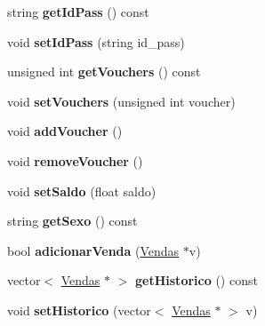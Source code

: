 \begin{DoxyCompactItemize}
\item 
\hypertarget{class_cliente_aa43047aa16c5f72c46a082dfb990074f}{string {\bfseries get\+Id\+Pass} () const }\label{class_cliente_aa43047aa16c5f72c46a082dfb990074f}

\item 
\hypertarget{class_cliente_a646583af1403099173848eda00f99ce7}{void {\bfseries set\+Id\+Pass} (string id\+\_\+pass)}\label{class_cliente_a646583af1403099173848eda00f99ce7}

\item 
\hypertarget{class_cliente_a1984ef662ce9ae14dbf654c0a6b8fb09}{unsigned int {\bfseries get\+Vouchers} () const }\label{class_cliente_a1984ef662ce9ae14dbf654c0a6b8fb09}

\item 
\hypertarget{class_cliente_aeb1b9cce72b0d01ce9bf1771a6b95c2d}{void {\bfseries set\+Vouchers} (unsigned int voucher)}\label{class_cliente_aeb1b9cce72b0d01ce9bf1771a6b95c2d}

\item 
\hypertarget{class_cliente_a0779a68f66b79b31e6dd8e5a25128f18}{void {\bfseries add\+Voucher} ()}\label{class_cliente_a0779a68f66b79b31e6dd8e5a25128f18}

\item 
\hypertarget{class_cliente_a73277ee6744a63e34233823634ec47df}{void {\bfseries remove\+Voucher} ()}\label{class_cliente_a73277ee6744a63e34233823634ec47df}

\item 
\hypertarget{class_cliente_a78fe91598a0632e05d09c9341c4b0716}{void {\bfseries set\+Saldo} (float saldo)}\label{class_cliente_a78fe91598a0632e05d09c9341c4b0716}

\item 
\hypertarget{class_cliente_a5e51d7c8aef74564f7e9770cd12b7fcf}{string {\bfseries get\+Sexo} () const }\label{class_cliente_a5e51d7c8aef74564f7e9770cd12b7fcf}

\item 
\hypertarget{class_cliente_a56fd118de07cc418426f5f54c3f4935f}{bool {\bfseries adicionar\+Venda} (\hyperlink{class_vendas}{Vendas} $\ast$v)}\label{class_cliente_a56fd118de07cc418426f5f54c3f4935f}

\item 
\hypertarget{class_cliente_ad2d27cf5a6a187c6a5faa4fee88cfd9f}{vector$<$ \hyperlink{class_vendas}{Vendas} $\ast$ $>$ {\bfseries get\+Historico} () const }\label{class_cliente_ad2d27cf5a6a187c6a5faa4fee88cfd9f}

\item 
\hypertarget{class_cliente_a340b3c4b25009f1020984743eb371208}{void {\bfseries set\+Historico} (vector$<$ \hyperlink{class_vendas}{Vendas} $\ast$ $>$ v)}\label{class_cliente_a340b3c4b25009f1020984743eb371208}

\end{DoxyCompactItemize}
